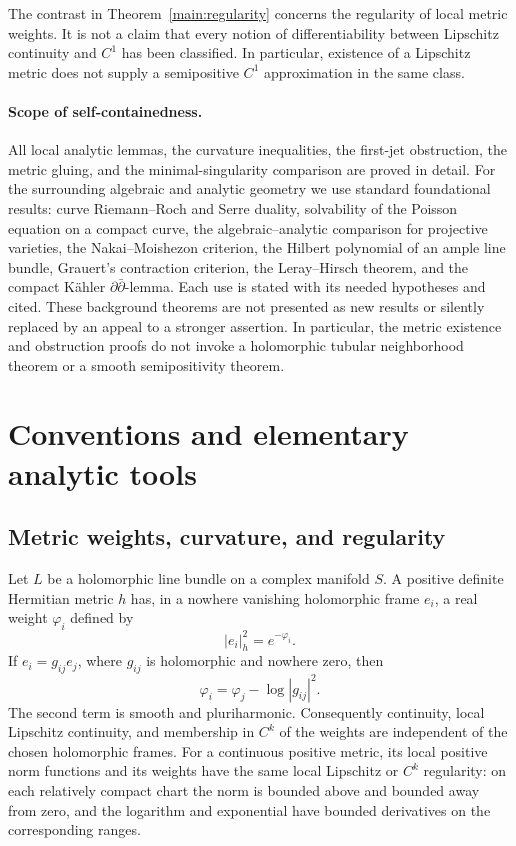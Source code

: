 \documentclass[11pt,a4paper]{article}
\numberwithin{equation}{section}
\theoremstyle{definition}
\theoremstyle{remark}
\begin{document}
The contrast in Theorem~\ref{main:regularity} concerns the regularity of local
metric weights. It is not a claim that every notion of differentiability
between Lipschitz continuity and $C^1$ has been classified. In particular,
existence of a Lipschitz metric does not supply a semipositive $C^1$
approximation in the same class.

\paragraph{Scope of self-containedness.}
All local analytic lemmas, the curvature inequalities, the first-jet
obstruction, the metric gluing, and the minimal-singularity comparison are
proved in detail. For the surrounding algebraic and analytic geometry we
use standard foundational results: curve Riemann--Roch and Serre duality,
solvability of the Poisson equation on a compact curve, the algebraic--analytic
comparison for projective varieties, the Nakai--Moishezon criterion,
the Hilbert polynomial of an ample line bundle, Grauert's contraction
criterion, the Leray--Hirsch theorem, and the compact K\"ahler
$\partial\bar\partial$-lemma. Each use is stated with its needed hypotheses
and cited. These background theorems are not presented as new results or
silently replaced by an appeal to a stronger assertion. In particular,
the metric existence and obstruction proofs do not invoke a holomorphic
tubular neighborhood theorem or a smooth semipositivity theorem.

\section{Conventions and elementary analytic tools}\label{sec:preliminaries}

\subsection{Metric weights, curvature, and regularity}
Let $L$ be a holomorphic line bundle on a complex manifold $S$. A positive
definite Hermitian metric $h$ has, in a nowhere vanishing holomorphic frame
$e_i$, a real weight $\varphi_i$ defined by
\[
 |e_i|_h^2=e^{-\varphi_i}.
\]
If $e_i=g_{ij}e_j$, where $g_{ij}$ is holomorphic and nowhere zero, then
\begin{equation}\label{eq:pre-weight-transition}
 \varphi_i=\varphi_j-\log|g_{ij}|^2.
\end{equation}
The second term is smooth and pluriharmonic. Consequently continuity,
local Lipschitz continuity, and membership in $C^k$ of the weights are
independent of the chosen holomorphic frames. For a continuous positive
metric, its local positive norm functions and its weights have the same
local Lipschitz or $C^k$ regularity: on each relatively compact chart the
norm is bounded above and bounded away from zero, and the logarithm and
exponential have bounded derivatives on the corresponding ranges.
\end{document}
